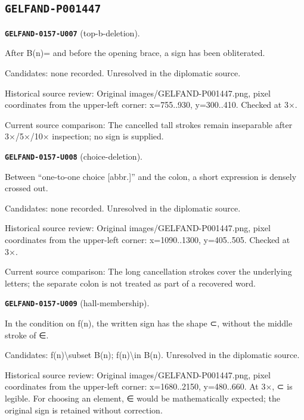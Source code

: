 \subsection*{\texttt{GELFAND-P001447}}
\par\noindent\leavevmode{}\label{GELFAND-0157-U007}\label{GELFAND-P001447:top-b-deletion}\textbf{\texttt{GELFAND-0157-U007}} (top-b-deletion).\nopagebreak[4]\par
After B(n)= and before the opening brace, a sign has been obliterated.\par
Candidates: none recorded. Unresolved in the diplomatic source.\par
Historical source review: Original images/GELFAND-P001447.png, pixel coordinates from the upper-left corner: x=755..930, y=300..410. Checked at 3×.\par
Current source comparison: The cancelled tall strokes remain inseparable after 3×/5×/10× inspection; no sign is supplied.\par\medskip
\par\noindent\leavevmode{}\label{GELFAND-0157-U008}\label{GELFAND-P001447:choice-deletion}\textbf{\texttt{GELFAND-0157-U008}} (choice-deletion).\nopagebreak[4]\par
Between “one-to-one choice [abbr.]” and the colon, a short expression is densely crossed out.\par
Candidates: none recorded. Unresolved in the diplomatic source.\par
Historical source review: Original images/GELFAND-P001447.png, pixel coordinates from the upper-left corner: x=1090..1300, y=405..505. Checked at 3×.\par
Current source comparison: The long cancellation strokes cover the underlying letters; the separate colon is not treated as part of a recovered word.\par\medskip
\par\noindent\leavevmode{}\label{GELFAND-0157-U009}\label{GELFAND-P001447:hall-membership}\textbf{\texttt{GELFAND-0157-U009}} (hall-membership).\nopagebreak[4]\par
In the condition on f(n), the written sign has the shape ⊂, without the middle stroke of ∈.\par
Candidates: f(n)\textbackslash{}subset B(n); f(n)\textbackslash{}in B(n). Unresolved in the diplomatic source.\par
Historical source review: Original images/GELFAND-P001447.png, pixel coordinates from the upper-left corner: x=1680..2150, y=480..660. At 3×, ⊂ is legible. For choosing an element, ∈ would be mathematically expected; the original sign is retained without correction.\par
